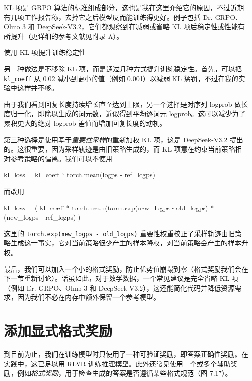 KL 项是 GRPO 算法的标准组成部分，这也是我在这里介绍它的原因，不过近期有几项工作报告称，去掉它之后模型反而能训练得更好。例子包括 Dr. GRPO、Olmo 3 和 DeepSeek-V3.2，它们都观察到在减弱或省略 KL 项后稳定性或性能有所提升（更详细的参考文献见附录 A）。

\begin{mySidebar}{使用 KL 项提升训练稳定性}

另一种做法是不移除 KL 项，而是通过几种方式提升训练稳定性。首先，可以把 \texttt{kl\_coeff} 从 0.02 减小到更小的值（例如 0.001）以减弱 KL 惩罚，不过在我的实验中这样并不够。

由于我们看到回复长度持续增长直至达到上限，另一个选择是对序列 logprob 做长度归一化，即除以生成的词元数，近似得到平均逐词元 logprob。这可以减少为了累积更大的绝对 logprob 差值而增加回复长度的动机。

第三种选择是使用基于\emph{重要性采样}的重新加权 KL 项，这是 DeepSeek-V3.2 提出的。这很重要，因为采样轨迹是由旧策略生成的，而 KL 项意在约束当前策略相对参考策略的偏离。我们可以不使用

\begin{codebox}
kl_loss = kl_coeff * torch.mean(logps - ref_logps)
\end{codebox}

而改用

\begin{codebox}
kl_loss = (
    kl_coeff * torch.mean(torch.exp(new_logps - old_logps)
    * (new_logps - ref_logps)
)
\end{codebox}

这里的 \texttt{torch.exp(new\_logps - old\_logps)} 重要性权重校正了采样轨迹由旧策略生成这一事实，它对当前策略很少产生的样本降权，对当前策略会产生的样本升权。

最后，我们可以加入一个小的格式奖励，防止优势值崩塌到零（格式奖励我们会在下一节重新讨论）。话虽如此，对于数学数据，一个常见建议是完全省略 KL 项（例如 Dr. GRPO、Olmo 3 和 DeepSeek-V3.2），这还能简化代码并降低资源需求，因为我们不必在内存中额外保留一个参考模型。

\end{mySidebar}

\section{添加显式格式奖励}

到目前为止，我们在训练模型时只使用了一种可验证奖励，即答案正确性奖励。在实践中，这已足以用 RLVR 训练推理模型。此外还常见使用一个或多个辅助奖励，例如\emph{格式奖励}，用于检查生成的答案是否遵循某些格式规范（图 7.17）。

